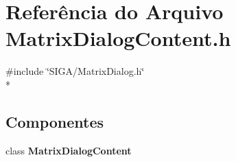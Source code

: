 \section{Referência do Arquivo Matrix\+Dialog\+Content.\+h}
\label{_matrix_dialog_content_8h}
{\ttfamily \#include \char`\"{}S\+I\+G\+A/\+Matrix\+Dialog.\+h\char`\"{}}\\*
\subsection*{Componentes}
\begin{DoxyCompactItemize}
\item 
class {\bf Matrix\+Dialog\+Content}
\end{DoxyCompactItemize}
